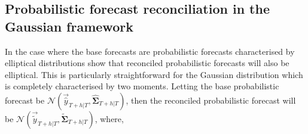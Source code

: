\documentclass[graybox]{svmult}
\begin{document}
\subsection{Probabilistic forecast reconciliation in the Gaussian framework}



In the case where the base forecasts are probabilistic forecasts characterised by elliptical distributions \cite{Gamakumara2018} show that reconciled probabilistic forecasts will also be elliptical.  This is particularly straightforward for the Gaussian distribution which is completely characterised by two moments.  Letting the base probabilistic forecast be $\mathscr{N}(\vec{\hat{y}}_{T+h|T}, \hat{\bm{\Sigma}}_{T+h|T})$, then the reconciled probabilistic forecast will be $\mathscr{N}(\vec{\tilde{y}}_{T+h|T}, \tilde{\bm{\Sigma}}_{T+h|T})$, where,
\end{document}
